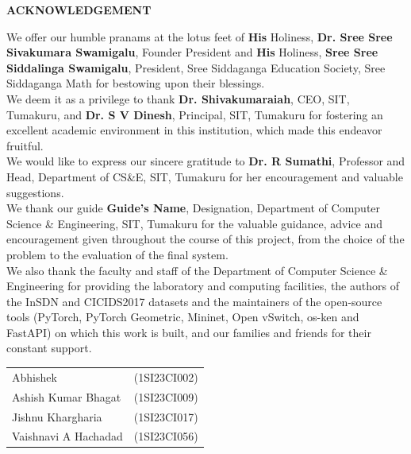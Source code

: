 \begin{titlepage}
\begin{center}
{\Large \textbf{ACKNOWLEDGEMENT}}
\end{center}

We offer our humble pranams at the lotus feet of \textbf{His} Holiness, \textbf{Dr. Sree Sree Sivakumara Swamigalu}, Founder President and \textbf{His} Holiness, \textbf{Sree Sree Siddalinga Swamigalu}, President, Sree Siddaganga Education Society, Sree Siddaganga Math for bestowing upon their blessings.\\

We deem it as a privilege to thank \textbf{Dr. Shivakumaraiah}, CEO, SIT, Tumakuru,  and \textbf{Dr. S V Dinesh}, Principal, SIT, Tumakuru for fostering an excellent academic environment in this institution, which made this endeavor fruitful.\\

We would like to express our sincere gratitude to \textbf{Dr. R Sumathi}, Professor and Head, Department of CS\&E, SIT, Tumakuru for her encouragement and valuable suggestions.\\

We thank our guide \textbf{Guide's Name}, Designation, Department of Computer Science \& Engineering, SIT, Tumakuru for the valuable guidance, advice and encouragement given throughout the course of this project, from the choice of the problem to the evaluation of the final system.\\

We also thank the faculty and staff of the Department of Computer Science \& Engineering for providing the laboratory and computing facilities, the authors of the InSDN and CICIDS2017 datasets and the maintainers of the open-source tools (PyTorch, PyTorch Geometric, Mininet, Open vSwitch, os-ken and FastAPI) on which this work is built, and our families and friends for their constant support.\\


\begin{flushright}
\begin{tabular}{ll}
Abhishek & (1SI23CI002)  \\
Ashish Kumar Bhagat & (1SI23CI009)  \\
Jishnu Khargharia & (1SI23CI017)  \\
Vaishnavi A Hachadad & (1SI23CI056)  \\
\end{tabular}\\[1.5cm]
\end{flushright}
\end{titlepage}
